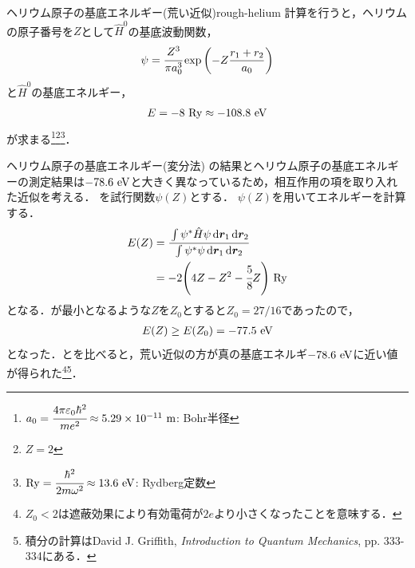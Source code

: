 \documentclass{report}
\begin{document}
  \begin{myex}{ヘリウム原子の基底エネルギー(荒い近似)}{rough-helium}
    計算を行うと，ヘリウムの原子番号を$Z$として$\hat{H}^0$の基底波動関数，
    \begin{align}
      \psi = \cfrac{Z^3}{\pi a_0^3}\exp\qty(-Z\frac{r_1 + r_2}{a_0})\label{helium}
    \end{align}
    と$\hat{H}^0$の基底エネルギー，
    \begin{align}
      E = -8\ \mathrm{Ry}\approx -108.8\ \mathrm{eV}\label{helium-rough-min}
    \end{align}
    が求まる\footnote{
      $a_0 = \cfrac{4\pi\epsilon_0\hbar^2}{me^2} \approx 5.29\times 10^{-11}\ \r{m}$: Bohr半径
    }\footnote{
      $Z = 2$
    }\footnote{
      $\mathrm{Ry} = \cfrac{\hbar^2}{2m\omega^2} \approx 13.6 \ \mathrm{eV}$: Rydberg定数
    }．
  \end{myex}
  \begin{myex}{ヘリウム原子の基底エネルギー(変分法)}{}
    の結果とヘリウム原子の基底エネルギーの測定結果は$-78.6\ \r{eV}$と大きく異なっているため，相互作用の項を取り入れた近似を考える．
    を試行関数$\psi(Z)$とする．
    $\psi(Z)$を用いてエネルギーを計算する．
    \begin{align}
      E(Z) &= \cfrac{\int\psi^{*}\hat{H}\psi \dd{\bm{r}_1}\dd{\bm{r}_2}}{\int\psi^{*}\psi \dd{\bm{r}_1}\dd{\bm{r}_2}} \\
      &= -2\qty(4Z - Z^2 - \cfrac{5}{8}Z)\ \r{Ry}\label{helium-energy-function} 
    \end{align}
    となる．が最小となるような$Z$を$Z_0$とすると$Z_0 = 27/16$であったので，
    \begin{align}
      E(Z) \geq E\qty(Z_0) = -77.5\ \r{eV}\label{helium-energy-varidation-min}
    \end{align}
    となった．とを比べると，荒い近似の方が真の基底エネルギ$-78.6\ \r{eV}$に近い値が得られた\footnote{
      $Z_0 < 2$は遮蔽効果により有効電荷が$2e$より小さくなったことを意味する．
    }\footnote{
      積分の計算はDavid J. Griffith, \textit{Introduction to Quantum Mechanics}, pp. 333-334にある．
    }．
  \end{myex}
\end{document}
